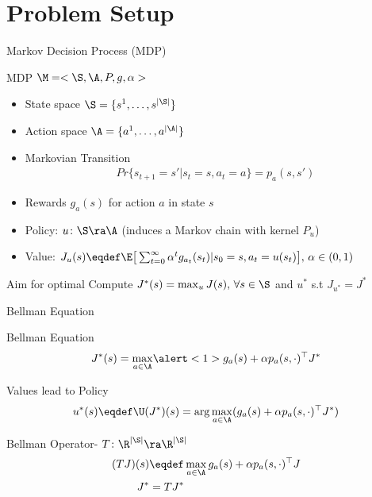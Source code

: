 \documentclass[10pt]{beamer}
\begin{document}
\section{Problem Setup}

\begin{frame}[fragile]{Markov Decision Process (MDP)}

\begin{block}{MDP $\M=<\S,\A,P,g,\alpha>$}
\begin{itemize}
\item State space $\S=\{s^1,\ldots,s^{|\S|}\}$\p
\item Action space $\A=\{a^1,\ldots,a^{|\A|}\}$\p
\item Markovian Transition
\begin{align*}
Pr\{s_{t+1}=s'| s_t=s, a_t=a\}=p_a(s,s')
\end{align*}\p
\item Rewards $g_a(s)$ for action $a$ in state $s$\p
\item Policy: $u\colon \S\ra \A$ (induces a Markov chain with kernel $P_u$)\p
\item Value: $J_u(s)\eqdef \E\big[\sum_{t=0}^\infty \alpha^t g_{a_t}(s_t)|s_0=s,a_t=u(s_t)\big],\,\alpha\in (0,1)$\p
\end{itemize}
\end{block}
\begin{block}{Aim for optimal}
Compute  $J^*(s)=\max_{u} J(s),\,\forall s\in \S$ and $u^*$ s.t $J_{u^*}=J^*$
\end{block}
\end{frame}


\begin{frame}[fragile]{Bellman Equation}

\begin{block}{Bellman Equation}
\begin{align*}
J^*(s)&={\max_{a\in \A}} \alert<1>{g_a(s)}+{\alpha p_a(s,\cdot)^\top J^*}\\
\end{align*}
\end{block}
\p
\begin{block}{Values lead to Policy}
\begin{align*}
u^*(s)\eqdef \U(J^*)(s) ={\arg\max_{a\in \A}} (g_a(s)+\alpha p_a(s,\cdot)^\top J^*)
\end{align*}
\end{block}
\normalsize
\p
\begin{block}{Bellman Operator- $T\colon \R^{|\S|}\ra \R^{|\S|}$}
\begin{align*}
(TJ)(s)&\eqdef\max_{a\in \A} g_a(s)+\alpha p_a(s,\cdot)^\top J\\
J^*&=TJ^*
\end{align*}
\end{block}
\end{frame}
\end{document}
